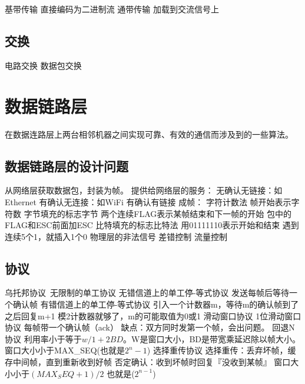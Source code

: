 \documentclass{ctexart}
\begin{document}
\begin{outline}
    \1 基带传输
        \2 直接编码为二进制流
    \1 通带传输
        \2 加载到交流信号上
\end{outline}
\subsection{交换}
\begin{outline}
    \1 电路交换
    \1 数据包交换
\end{outline}
\section{数据链路层}
在数据连路层上两台相邻机器之间实现可靠、有效的通信而涉及到的一些算法。 
\subsection{数据链路层的设计问题}
\begin{outline}
    \1 从网络层获取数据包，封装为帧。
    \1 提供给网络层的服务：
        \2 无确认无链接：如Ethernet
        \2 有确认无连接：如WiFi
        \2 有确认有链接
    \1 成帧：
        \2 字符计数法
            \3 帧开始表示字符数
        \2 字节填充的标志字节
            \3 两个连续FLAG表示某帧结束和下一帧的开始
            \3 包中的FLAG和ESC前面加ESC
        \2 比特填充的标志比特法
            \3 用01111110表示开始和结束
            \3 遇到连续5个1，就插入1个0
        \2 物理层的非法信号
    \1 差错控制
    \1 流量控制
\end{outline}
\subsection{协议}
\begin{outline}
    \1 乌托邦协议\ 无限制的单工协议
    \1 无错信道上的单工停-等式协议
        \2 发送每帧后等待一个确认帧
    \1 有错信道上的单工停-等式协议
        \2 引入一个计数器m，等待m的确认帧到了之后回复m+1
        \2 模2计数器就够了，m的可能取值为0或1
    \1 滑动窗口协议
        \2 1位滑动窗口协议
            \3 每帧带一个确认帧（ack）
            \3 缺点：双方同时发第一个帧，会出问题。
        \2 回退N协议
            \3 利用率小于等于$w / 1 + 2BD$。W是窗口大小，BD是带宽乘延迟除以帧大小。
            \3 窗口大小小于MAX_SEQ(也就是$2^n - 1$)
        \2 选择重传协议
            \3 选择重传：丢弃坏帧，缓存中间帧，直到重新收到好帧
            \3 否定确认：收到坏帧时回复『没收到某帧』
            \3 窗口大小小于$(MAX_SEQ + 1) / 2$ 也就是($2^{n-1}$)
\end{outline}
\end{document}
